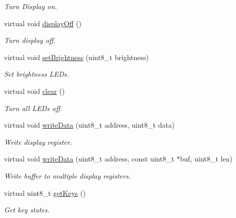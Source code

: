 \begin{DoxyCompactItemize}
\begin{DoxyCompactList}\small\item\em Turn Display on. \end{DoxyCompactList}\item 
virtual void \hyperlink{class_t_m1637_a816eb1d4c20c91dc0e7e46c33b5eba35}{display\+Off} ()\hypertarget{class_t_m1637_a816eb1d4c20c91dc0e7e46c33b5eba35}{}\label{class_t_m1637_a816eb1d4c20c91dc0e7e46c33b5eba35}

\begin{DoxyCompactList}\small\item\em Turn display off. \end{DoxyCompactList}\item 
virtual void \hyperlink{class_t_m1637_ae3c46c9324cbface69396541929bd49f}{set\+Brightness} (uint8\+\_\+t brightness)
\begin{DoxyCompactList}\small\item\em Set brightness L\+ED\textquotesingle{}s. \end{DoxyCompactList}\item 
virtual void \hyperlink{class_t_m1637_ab1a606ac4c331a5a58bfd76a7ad4b719}{clear} ()\hypertarget{class_t_m1637_ab1a606ac4c331a5a58bfd76a7ad4b719}{}\label{class_t_m1637_ab1a606ac4c331a5a58bfd76a7ad4b719}

\begin{DoxyCompactList}\small\item\em Turn all L\+ED\textquotesingle{}s off. \end{DoxyCompactList}\item 
virtual void \hyperlink{class_t_m1637_ad69758488fdcce575f7db6ae5530b37b}{write\+Data} (uint8\+\_\+t address, uint8\+\_\+t data)
\begin{DoxyCompactList}\small\item\em Write display register. \end{DoxyCompactList}\item 
virtual void \hyperlink{class_t_m1637_a88e415e647bf2099d3124cbd938a29e7}{write\+Data} (uint8\+\_\+t address, const uint8\+\_\+t $\ast$buf, uint8\+\_\+t len)
\begin{DoxyCompactList}\small\item\em Write buffer to multiple display registers. \end{DoxyCompactList}\item 
virtual uint8\+\_\+t \hyperlink{class_t_m1637_a10f09b20dc25f0ef03ccf9d28c99a64f}{get\+Keys} ()
\begin{DoxyCompactList}\small\item\em Get key states. \end{DoxyCompactList}\end{DoxyCompactItemize}
